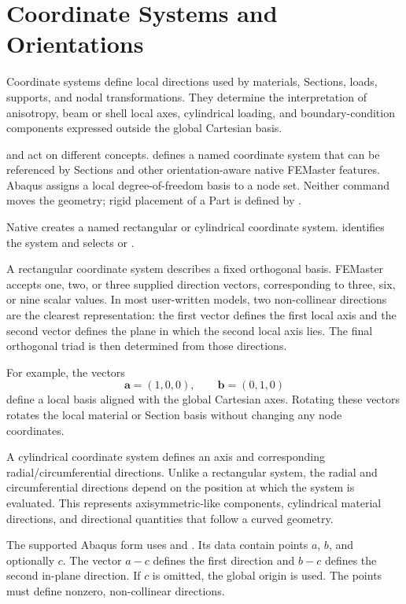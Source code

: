 \chapter{Coordinate Systems and Orientations}
\label{chap:coordinates}

Coordinate systems define local directions used by materials, Sections, loads, supports, and nodal transformations. They determine the interpretation of anisotropy, beam or shell local axes, cylindrical loading, and boundary-condition components expressed outside the global Cartesian basis.

 and  act on different concepts.  defines a named coordinate system that can be referenced by Sections and other orientation-aware native FEMaster features. Abaqus  assigns a local degree-of-freedom basis to a node set. Neither command moves the geometry; rigid placement of a Part is defined by .


Native  creates a named rectangular or cylindrical coordinate system.  identifies the system and  selects  or .

A rectangular coordinate system describes a fixed orthogonal basis. FEMaster accepts one, two, or three supplied direction vectors, corresponding to three, six, or nine scalar values. In most user-written models, two non-collinear directions are the clearest representation: the first vector defines the first local axis and the second vector defines the plane in which the second local axis lies. The final orthogonal triad is then determined from those directions.

For example, the vectors
\[
\boldsymbol a=(1,0,0),\qquad \boldsymbol b=(0,1,0)
\]
define a local basis aligned with the global Cartesian axes. Rotating these vectors rotates the local material or Section basis without changing any node coordinates.

A cylindrical coordinate system defines an axis and corresponding radial/circumferential directions. Unlike a rectangular system, the radial and circumferential directions depend on the position at which the system is evaluated. This represents axisymmetric-like components, cylindrical material directions, and directional quantities that follow a curved geometry.

The supported Abaqus  form uses  and . Its data contain points \(a\), \(b\), and optionally \(c\). The vector \(a-c\) defines the first direction and \(b-c\) defines the second in-plane direction. If \(c\) is omitted, the global origin is used. The points must define nonzero, non-collinear directions.

